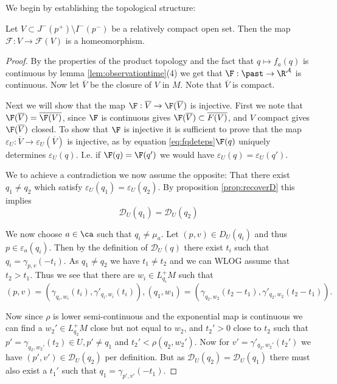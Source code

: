 We begin by establishing the topological structure:
\begin{lemma}\label{lem:Fhomeo}
Let $V\subset J^-(p^+)\setminus I^-(p^-)$ be a relatively compact open set.
Then the map $\mathcal{F}:V\to\mathcal{F}(V)$ is a homeomorphism.
\end{lemma}
\begin{proof}
By the properties of the product topology and the fact that $q\mapsto f_a(q)$ is continuous by lemma \ref{lem:observationtime}(4) we get that $\F:\past\to\R^\mathcal{A}$ is continuous.
Now let $\overline{V}$ be the closure of $V$ in $M$. Note that $\overline{V}$ is compact.

Next we will show that the map $\F:\overline{V}\to\F(\overline{V})$ is injective. First we note that $\F(\overline{V})=\overline{\F(V)}$, since $\F$ is continuous gives $\F(\overline{V}) \subset \overline{F(V)}$, and $V$ compact gives $\F(\overline{V})$ closed. To show that $\F$ is injective it is sufficient to prove that the map $\varepsilon_U:\overline{V}\to\varepsilon_U(\overline{V})$ is injective, as by equation \eqref{eq:fqdeteps}$ \F(q)$ uniquely determines $\varepsilon_U(q)$. I.e. if $\F(q)=\F(q')$ we would have $\varepsilon_U(q)=\varepsilon_U(q')$.

We to achieve a contradiction we now assume the opposite: That there exist $q_1\neq q_2$ which satisfy $\varepsilon_U(q_1) = \varepsilon_U(q_2)$. By proposition \ref{prop:recoverD} this implies 
\[
\mathcal{D}_U(q_1) = \mathcal{D}_U(q_2)
\]

We now choose $a\in \ca$ such that $q_i\neq \mu_a$. Let $(p,v)\in D_U(q_i)$ and thus $p\in \varepsilon_a(q_i)$. Then by the definition of $\mathcal{D}_U(q)$ there exist $t_i$ such that $q_i=\gamma_{p,v}(-t_i)$. As $q_1\neq q_2$ we have $t_1\neq t_2$ and we can WLOG assume that $t_2>t_1$. Thus we see that there are $w_i\in L^+_{q_i}M$ such that 
\[
(p,v) = (\gamma_{q_i,w_i}(t_i),\gamma'_{q_i,w_i}(t_i)), (q_1,w_1) = (\gamma_{q_2,w_2}(t_2-t_1),\gamma'_{q_2,w_2}(t_2-t_1)).
\]

Now since $\rho$ is lower semi-continuous and the exponential map is continuous we can find a $w_2'\in L^+_{q_2}M$ close but not equal to $w_2$, and $t_2'>0$ close to $t_2$ such that $p'=\gamma_{q_2,w_2'}(t_2)\in U, p'\neq q_1$ and $t_2'<\rho(q_2,w_2')$. Now for $v'=\gamma'_{q_2,w_2'}(t_2')$ we have $(p',v')\in \mathcal{D}_U(q_2)$ per definition. But as $\mathcal{D}_U(q_2)=\mathcal{D}_U(q_1)$ there must also exist a $t_1'$ such that $q_1=\gamma_{p',v'}(-t_1)$.


\end{proof}
